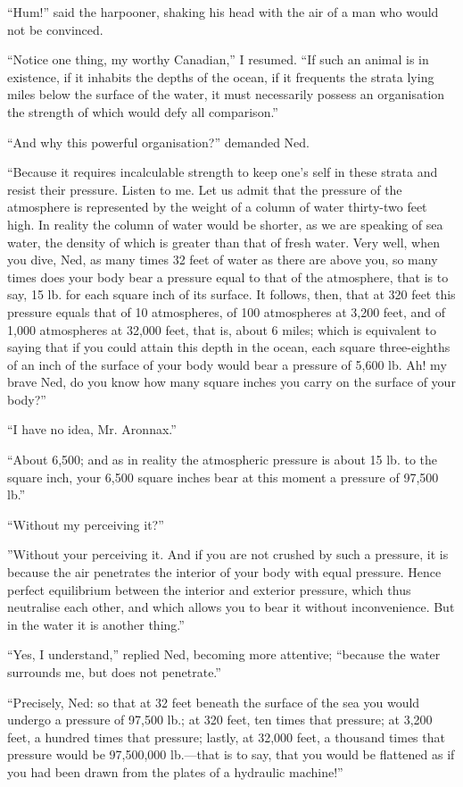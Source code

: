 ``Hum!'' said the harpooner, shaking his head with the air of a man
who would not be convinced.

``Notice one thing, my worthy Canadian,'' I resumed.
``If such an animal is in existence, if it inhabits the depths
of the ocean, if it frequents the strata lying miles below
the surface of the water, it must necessarily possess an
organisation the strength of which would defy all comparison.''

``And why this powerful organisation?'' demanded Ned.

``Because it requires incalculable strength to keep one's self
in these strata and resist their pressure.  Listen to me.
Let us admit that the pressure of the atmosphere is represented
by the weight of a column of water thirty-two feet high.
In reality the column of water would be shorter, as we are
speaking of sea water, the density of which is greater than
that of fresh water.  Very well, when you dive, Ned, as many
times 32 feet of water as there are above you, so many times
does your body bear a pressure equal to that of the atmosphere,
that is to say, 15 lb.  for each square inch of its surface.
It follows, then, that at 320 feet this pressure equals
that of 10 atmospheres, of 100 atmospheres at 3,200 feet,
and of 1,000 atmospheres at 32,000 feet, that is, about 6 miles;
which is equivalent to saying that if you could attain this
depth in the ocean, each square three-eighths of an inch
of the surface of your body would bear a pressure of 5,600 lb.
Ah! my brave Ned, do you know how many square inches you carry on
the surface of your body?''

``I have no idea, Mr. Aronnax.''

``About 6,500; and as in reality the atmospheric pressure is about 15 lb.
to the square inch, your 6,500 square inches bear at this moment a pressure
of 97,500 lb.''

``Without my perceiving it?''

''Without your perceiving it.  And if you are not crushed by
such a pressure, it is because the air penetrates the interior
of your body with equal pressure.  Hence perfect equilibrium
between the interior and exterior pressure, which thus neutralise
each other, and which allows you to bear it without inconvenience.
But in the water it is another thing.''

``Yes, I understand,'' replied Ned, becoming more attentive;
``because the water surrounds me, but does not penetrate.''

``Precisely, Ned:  so that at 32 feet beneath the surface of the sea you would
undergo a pressure of 97,500 lb.; at 320 feet, ten times that pressure;
at 3,200 feet, a hundred times that pressure; lastly, at 32,000 feet,
a thousand times that pressure would be 97,500,000 lb.---that is to say,
that you would be flattened as if you had been drawn from the plates of
a hydraulic machine!''

